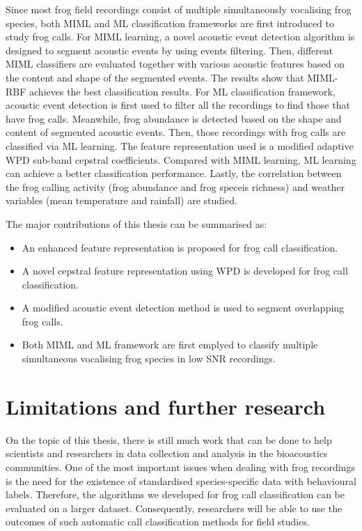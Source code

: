 Since most frog field recordings consist of multiple simultaneously vocalising frog species, both MIML and ML classification frameworks are first introduced to study frog calls. For MIML learning, a novel acoustic event detection algorithm is designed to segment acoustic events by using events filtering. Then, different MIML classifiers are evaluated together with various acoustic features based on the content and shape of the segmented events. The results show that MIML-RBF achieves the best classification results. 
For ML classification framework, acoustic event detection is first used to filter all the recordings to find those that have frog calls. Meanwhile, frog abundance is detected based on the shape and content of segmented acoustic events. Then, those recordings with frog calls are classified via ML learning. The feature representation used is a modified adaptive WPD sub-band cepstral coefficients. Compared with MIML learning, ML learning can achieve a better classification performance. Lastly, the correlation between the frog calling activity (frog abundance and frog speceis richness) and weather variables (mean temperature and rainfall) are studied.



The major contributions of this thesis can be summarised as:
\begin{itemize}

\item An enhanced feature representation is proposed for frog call classification.
\item A novel cepstral feature representation using WPD is developed for frog call classification.
\item A modified acoustic event detection method is used to segment overlapping frog calls.
\item Both MIML and ML framework are first emplyed to classify multiple simultaneous vocalising frog species in low SNR recordings.

\end{itemize}


\section{Limitations and further research}	
On the topic of this thesis, there is still much work that can be done to help scientists and researchers in data collection and analysis in the bioacoustics communities. One of the most important issues when dealing with frog recordings is the need for the existence of standardised species-specific data with behavioural labels. 
Therefore, the algorithms we developed for frog call classification can be evaluated on a larger dataset. 
Consequently, researchers will be able to use the outcomes of such automatic call classification methods for field studies.

